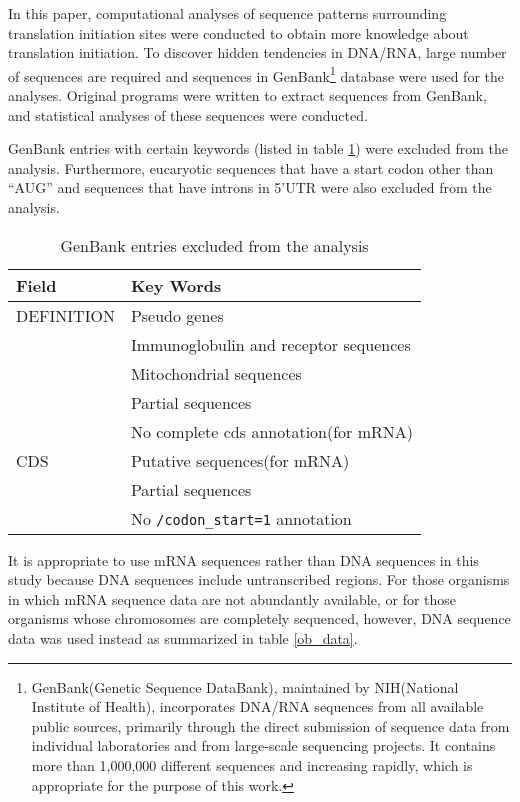 In this paper, computational analyses of sequence patterns surrounding
translation initiation sites were conducted to obtain more knowledge
about translation initiation. To discover hidden tendencies in
DNA/RNA, large number of sequences are required and sequences in
GenBank\footnote{GenBank(Genetic Sequence DataBank), maintained by
NIH(National Institute of Health), incorporates DNA/RNA sequences from
all available public sources, primarily through the direct submission
of sequence data from individual laboratories and from large-scale
sequencing projects. It contains more than 1,000,000 different
sequences and increasing rapidly, which is appropriate for the
purpose of this work.}\cite{label1700} database were used for the
analyses. Original programs were written to extract sequences from
GenBank, and statistical analyses of these sequences were conducted.

GenBank entries with certain keywords (listed in table \ref{exclu})
were excluded from the analysis.  Furthermore, eucaryotic sequences
that have a start codon other than ``AUG'' and sequences that have
introns in 5'UTR were also excluded from the analysis.

\begin{table}
\begin{center}
\begin{tabular}{|l|l|}
\hline
Field & Key Words\\
\hline
DEFINITION & Pseudo genes\\
           & Immunoglobulin and receptor sequences\\
           & Mitochondrial sequences\\
           & Partial sequences\\
           & No complete cds annotation(for mRNA)\\
\hline
CDS        & Putative sequences(for mRNA)\\
           & Partial sequences\\
           & No \verb+/codon_start=1+ annotation\\
\hline
\end{tabular}
\end{center}
\caption{GenBank entries excluded from the analysis}
\label{exclu}
\end{table}

It is appropriate to use mRNA sequences rather than DNA sequences in
this study because DNA sequences include untranscribed regions.  For
those organisms in which mRNA sequence data are not abundantly
available, or for those organisms whose chromosomes are completely
sequenced, however, DNA sequence data was used instead as summarized
in table \ref{ob_data}.

